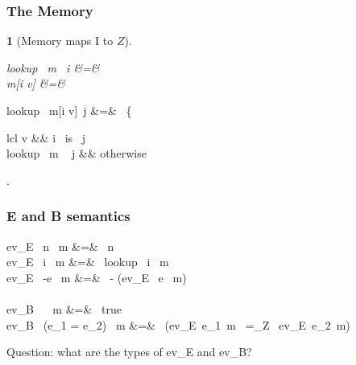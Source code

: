 \documentclass{beamer}
\newtheorem{remark}{}
\begin{document}
\frame
{
    \frametitle{The Memory}

\begin{remark}[Memory maps I to \(Z\)]
\begin{haskell}
lookup ~m~ i &=&\relax~ 
\\
m[i {\mapsto} v] &=&\relax~ 
\end{haskell}
\end{remark}

\begin{haskell}
lookup ~m[i {\mapsto} v]~j &=&\relax~ 
\left\{
\begin{array}{lcl}
v && i \mbox{ is } j
\\
lookup~ m ~ j && \mbox{otherwise}
\end{array}
\right.
\end{haskell}

}


\frame
{
    \frametitle{E and B semantics}
    
\begin{haskell}
ev_E~ n~ m &=&\relax~ n
\\
ev_E~ i~ m &=&\relax~ lookup~ i ~m
\\
ev_E~ {-}e~ m &=&\relax~ - (ev_E ~e~ m)
\\
\lefteqn{~~~~~\ldots}
\\
ev_B~ ~ m &=&\relax~ true
\\
ev_B~ (e_1 = e_2)~ m &=&\relax~ (ev_E~e_1~m~ =_Z ~ev_E~e_2~m)
\\
\lefteqn{~~~~~\ldots}
\end{haskell}

\pause
Question: what are the types of \<ev_E\> and \<ev_B\>?

}
\end{document}
